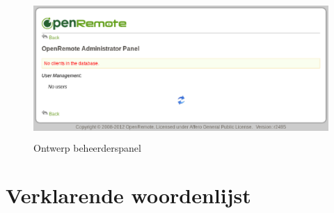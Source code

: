 \documentclass{article}
\begin{document}
\begin{figure}[h!]
  \centering
    \includegraphics[height=150pt,keepaspectratio]{controller.eps} 
  \caption{Ontwerp beheerderspanel}
\end{figure}

\newpage
\section{Verklarende woordenlijst}
\end{document}
